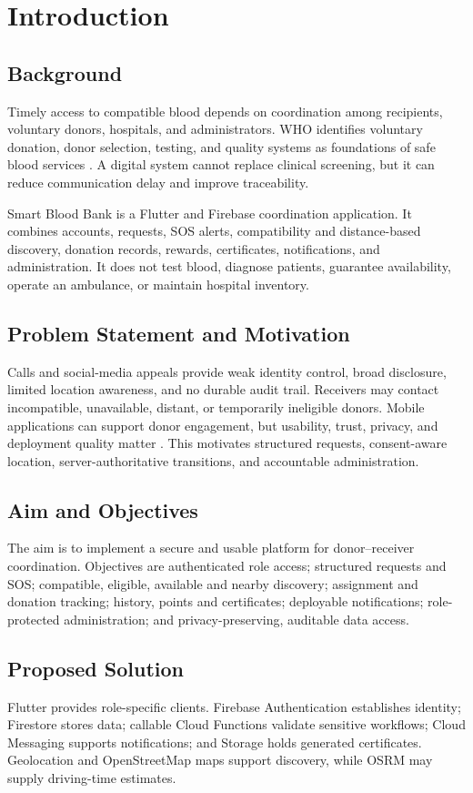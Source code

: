 \chapter{Introduction}\label{ch:introduction}
\section{Background}
Timely access to compatible blood depends on coordination among recipients, voluntary donors, hospitals, and administrators. WHO identifies voluntary donation, donor selection, testing, and quality systems as foundations of safe blood services \cite{whoBloodSafety,whoDonationFAQ}. A digital system cannot replace clinical screening, but it can reduce communication delay and improve traceability.

Smart Blood Bank is a Flutter and Firebase coordination application. It combines accounts, requests, SOS alerts, compatibility and distance-based discovery, donation records, rewards, certificates, notifications, and administration. It does not test blood, diagnose patients, guarantee availability, operate an ambulance, or maintain hospital inventory.
\section{Problem Statement and Motivation}
Calls and social-media appeals provide weak identity control, broad disclosure, limited location awareness, and no durable audit trail. Receivers may contact incompatible, unavailable, distant, or temporarily ineligible donors. Mobile applications can support donor engagement, but usability, trust, privacy, and deployment quality matter \cite{li2023mobile}. This motivates structured requests, consent-aware location, server-authoritative transitions, and accountable administration.
\section{Aim and Objectives}
The aim is to implement a secure and usable platform for donor--receiver coordination. Objectives are authenticated role access; structured requests and SOS; compatible, eligible, available and nearby discovery; assignment and donation tracking; history, points and certificates; deployable notifications; role-protected administration; and privacy-preserving, auditable data access.
\section{Proposed Solution}
Flutter provides role-specific clients. Firebase Authentication establishes identity; Firestore stores data; callable Cloud Functions validate sensitive workflows; Cloud Messaging supports notifications; and Storage holds generated certificates. Geolocation and OpenStreetMap maps support discovery, while OSRM may supply driving-time estimates.
